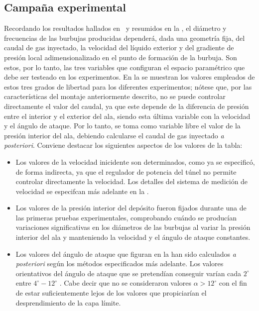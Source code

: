 \subsection{Campaña experimental}

Recordando los resultados hallados en~\cite{Evangelio2015} y resumidos en la , el diámetro y frecuencias de las burbujas producidas dependerá, dada una geometría fija, del caudal de gas inyectado, la velocidad del líquido exterior y  del gradiente de presión local adimensionalizado en el punto de formación de la burbuja. Son estos, por lo tanto, las tres variables que configuran el espacio paramétrico que debe ser testeado en los experimentos.  En la  se muestran los valores empleados de estos tres grados de libertad para los diferentes experimentos; nótese que, por las características del montaje anteriormente descrito, no se puede controlar directamente el valor del caudal, ya que este depende de la diferencia de presión entre el interior y el exterior del ala, siendo esta última variable con la velocidad y el ángulo de ataque. Por lo tanto, se toma como variable libre el valor de la presión interior del ala, debiendo calcularse el caudal de gas inyectado \textit{a posteriori}. Conviene destacar los siguientes aspectos de los valores de la tabla:

\begin{itemize}
\item Los valores de la velocidad inicidente son determinados, como ya se especificó, de forma indirecta, ya que el regulador de potencia del túnel no permite controlar directamente la velocidad. Los detalles del sistema de medición de velocidad se especifcan más adelante en la .
\item Los valores de la presión interior del depósito fueron fijados durante una de las primeras pruebas experimentales, comprobando cuándo se producían variaciones significativas en los diámetros de las burbujas al variar la presión interior del ala  y manteniendo la velocidad y el ángulo de ataque constantes. 
\item Los valores del ángulo de ataque que figuran en la  han sido calculados \textit{a posteriori } según los métodos especificados más adelante. Los valores orientativos del ángulo de ataque que se pretendían conseguir varían cada $2^{\circ}$ entre $4^{\circ}-12^{\circ}$ . Cabe decir que no se consideraron valores $\alpha > 12^{\circ}$ con el fin de estar suficientemente lejos de los valores que propiciarían el desprendimiento de la capa límite. 
\end{itemize}


